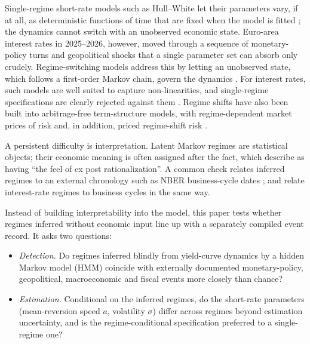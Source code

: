 \documentclass[11pt,a4paper]{article}
\begin{document}
Single-regime short-rate models such as Hull--White let their parameters vary, if at all, as deterministic functions of time that are fixed when the model is fitted \citep[eq.~3]{hullwhite1990}; the dynamics cannot switch with an unobserved economic state. Euro-area interest rates in 2025--2026, however, moved through a sequence of monetary-policy turns and geopolitical shocks that a single parameter set can absorb only crudely. Regime-switching models address this by letting an unobserved state, which follows a first-order Markov chain, govern the dynamics \citep[p.~357 and eq.~2.2]{hamilton1989}. For interest rates, such models are well suited to capture non-linearities, and single-regime specifications are clearly rejected against them \citep[abstract and p.~2]{angbekaert1998}. Regime shifts have also been built into arbitrage-free term-structure models, with regime-dependent market prices of risk \citep{bansalzhou2001} and, in addition, priced regime-shift risk \citep{dai2006}.

A persistent difficulty is interpretation. Latent Markov regimes are statistical objects; their economic meaning is often assigned after the fact, which \citet[p.~1]{bie2025} describe as having ``the feel of ex post rationalization''. A common check relates inferred regimes to an external chronology such as NBER business-cycle dates \citep[p.~374]{hamilton1989}; \citet[abstract]{angbekaert1998} and \citet[abstract]{bansalzhou2001} relate interest-rate regimes to business cycles in the same way.

Instead of building interpretability into the model, this paper tests whether regimes inferred without economic input line up with a separately compiled event record. It asks two questions:
\begin{itemize}\setlength{\itemsep}{1pt}
\item[(a)] \emph{Detection.} Do regimes inferred blindly from yield-curve dynamics by a hidden Markov model (HMM) coincide with externally documented monetary-policy, geopolitical, macroeconomic and fiscal events more closely than chance?
\item[(b)] \emph{Estimation.} Conditional on the inferred regimes, do the short-rate parameters (mean-reversion speed $a$, volatility $\sigma$) differ across regimes beyond estimation uncertainty, and is the regime-conditional specification preferred to a single-regime one?
\end{itemize}
\end{document}
